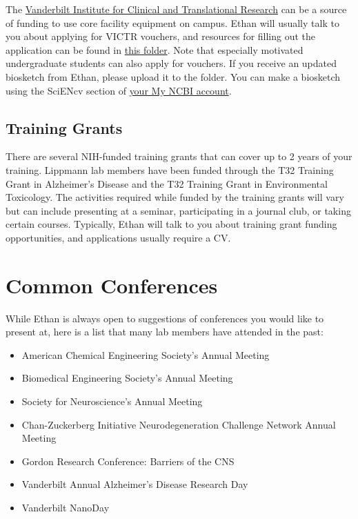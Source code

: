 \documentclass[
]{book}
\begin{document}
The \href{https://victr.vumc.org/}{Vanderbilt Institute for Clinical and Translational Research} can be a source of funding to use core facility equipment on campus. Ethan will usually talk to you about applying for VICTR vouchers, and resources for filling out the application can be found in \href{https://drive.google.com/drive/folders/1xe3LeIbXhmq09adtJ0cnFZ08d9W6Qn29?usp=sharing}{this folder}. Note that especially motivated undergraduate students can also apply for vouchers. If you receive an updated biosketch from Ethan, please upload it to the folder. You can make a biosketch using the SciENcv section of \href{https://www.ncbi.nlm.nih.gov/myncbi/}{your My NCBI account}.

\hypertarget{training-grants}{%
\subsection{Training Grants}\label{training-grants}}

There are several NIH-funded training grants that can cover up to 2 years of your training. Lippmann lab members have been funded through the T32 Training Grant in Alzheimer's Disease and the T32 Training Grant in Environmental Toxicology. The activities required while funded by the training grants will vary but can include presenting at a seminar, participating in a journal club, or taking certain courses. Typically, Ethan will talk to you about training grant funding opportunities, and applications usually require a CV.

\hypertarget{common-conferences}{%
\section{Common Conferences}\label{common-conferences}}

While Ethan is always open to suggestions of conferences you would like to present at, here is a list that many lab members have attended in the past:

\begin{itemize}
\item
  American Chemical Engineering Society's Annual Meeting
\item
  Biomedical Engineering Society's Annual Meeting
\item
  Society for Neuroscience's Annual Meeting
\item
  Chan-Zuckerberg Initiative Neurodegeneration Challenge Network Annual Meeting
\item
  Gordon Research Conference: Barriers of the CNS
\item
  Vanderbilt Annual Alzheimer's Disease Research Day
\item
  Vanderbilt NanoDay
\end{itemize}
\end{document}
